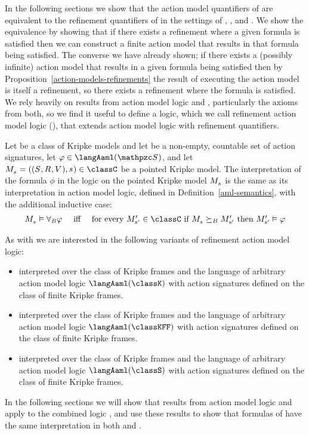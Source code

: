 
In the following sections we show that the action model quantifiers of \logicAaml{} are equivalent to the refinement quantifiers of \logicRml{} in the settings of \classK{}, \classKFF{}, and \classS{}.
We show the equivalence by showing that if there exists a refinement where a given formula is satisfied then we can construct a finite action model that results in that formula being satisfied.
The converse we have already shown; if there exists a (possibly infinite) action model that results in a given formula being satisfied then by Proposition~\ref{action-models-refinements} the result of executing the action model is itself a refinement, so there exists a refinement where the formula is satisfied.
We rely heavily on results from action model logic and \logicRml{}, particularly the axioms from both, so we find it useful to define a logic, which we call refinement action model logic (\logicRaml{}), that extends action model logic with refinement quantifiers.

\begin{definition}
Let \classC{} be a class of Kripke models and let \aSignatureFamily{} be a non-empty, countable set of action signatures, let $\phi \in \langAaml(\aSignatureFamily)$, and let $\kPModelAndTuple{\kStateS} \in \classC$ be a pointed Kripke model.
The interpretation of the formula $\phi$ in the logic \logicRamlC{} on the pointed Kripke model $\kPModel{\kStateS}$ is the same as its interpretation in action model logic, defined in Definition~\ref{aml-semantics}, with the additional inductive case:
$$
\begin{array}{lcl}
    \kPModel{\kStateS} \entails \allactsBs \phi & \text{ iff } & \text{for every } \kPModelP{\kStateSP} \in \classC \text{ if } \kPModel{\kStateS} \simulatesBs \kPModelP{\kStateSP} \text{ then } \kPModelP{\kStateSP} \entails \phi
\end{array}
$$
\end{definition}

As with \logicAaml{} we are interested in the following variants of refinement action model logic:
\begin{itemize}
    \item \logicRamlK{} interpreted over the class of \classK{} Kripke frames and the language of arbitrary action model logic $\langAaml(\classK)$ with action signatures defined on the class of finite \classK{} Kripke frames.
    \item \logicRamlKFF{} interpreted over the class of \classKFF{} Kripke frames and the language of arbitrary action model logic $\langAaml(\classKFF)$ with action signatures defined on the class of finite \classKFF{} Kripke frames.
    \item \logicRamlS{} interpreted over the class of \classS{} Kripke frames and the language of arbitrary action model logic $\langAaml(\classS)$ with action signatures defined on the class of finite \classS{} Kripke frames.
\end{itemize}

In the following sections we will show that results from action model logic and \logicRml{} apply to the combined logic \logicRaml{}, and use these results to show that formulas of \langAaml{} have the same interpretation in both \logicAaml{} and \logicRaml{}.
